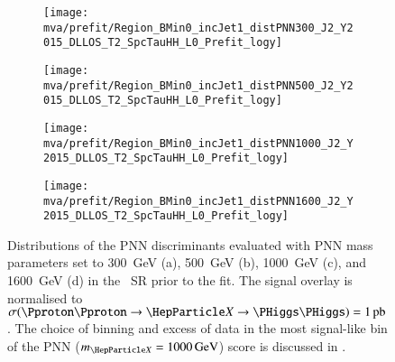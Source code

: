 \begin{figure}[htbp]
  \centering

  \begin{subfigure}[t]{.49\textwidth}
    \texttt{[image: mva/prefit/Region\_BMin0\_incJet1\_distPNN300\_J2\_Y2015\_DLLOS\_T2\_SpcTauHH\_L0\_Prefit\_logy]}
    \caption{}
    \label{fig:pnn_score_prefit_300}
  \end{subfigure}\hfill%
  \begin{subfigure}[t]{.49\textwidth}
    \centering
    \texttt{[image: mva/prefit/Region\_BMin0\_incJet1\_distPNN500\_J2\_Y2015\_DLLOS\_T2\_SpcTauHH\_L0\_Prefit\_logy]}
    \caption{}
    \label{fig:pnn_score_prefit_500}
  \end{subfigure}

  \begin{subfigure}[t]{.49\textwidth}
    \centering
    \texttt{[image: mva/prefit/Region\_BMin0\_incJet1\_distPNN1000\_J2\_Y2015\_DLLOS\_T2\_SpcTauHH\_L0\_Prefit\_logy]}
    \caption{}
    \label{fig:pnn_score_prefit_1000}
  \end{subfigure}\hfill%
  \begin{subfigure}[t]{.49\textwidth}
    \centering
    \texttt{[image: mva/prefit/Region\_BMin0\_incJet1\_distPNN1600\_J2\_Y2015\_DLLOS\_T2\_SpcTauHH\_L0\_Prefit\_logy]}
    \caption{}
    \label{fig:pnn_score_prefit_1600}
  \end{subfigure}

  \caption[Distributions of the PNN discriminants in the \hadhad
  SR.]{Distributions of the PNN discriminants evaluated with PNN mass parameters
    set to \SI{300}{\GeV} (a), \SI{500}{\GeV} (b), \SI{1000}{\GeV} (c), and
    \SI{1600}{\GeV} (d) in the \hadhad~SR prior to the fit.  The signal overlay
    is normalised to
    $\sigma(\Pproton\Pproton \to \PX \to \HH) = \SI{1}{\pico\barn}$. The choice
    of binning and excess of data in the most signal-like bin of the PNN
    ($\mX = \SI{1000}{\GeV}$) score is discussed in
    .}%
  \label{fig:pnn_score_prefit}
\end{figure}

